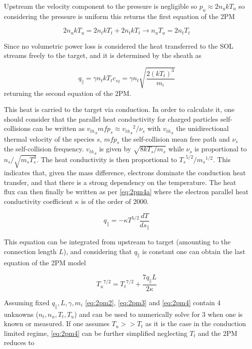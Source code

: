 Upstream the velocity component to the pressure is negligible so $p_u \approx 2 n_u k T_u$ so considering the pressure is uniform this returns the first equation of the 2PM

\begin{equation}
2 n_u k T_u = 2n_{t} k T_{t} + 2n_{t} k T_{t} \rightarrow n_u T_u = 2n_{t}T_{t}
\label{eq:2pm2}
\end{equation}

Since no volumetric power loss is considered the heat transferred to the SOL streams freely to the target, and it is determined by the sheath as

\begin{equation}
q_{\parallel} =  \gamma n_t k T_t {c_s}_t = \gamma n_t \sqrt{\frac{2(kT_t)^3}{m_i}}
\label{eq:2pm3}
\end{equation}
returning the second equation of the 2PM.

This heat is carried to the target via conduction. In order to calculate it, one should consider that the parallel heat conductivity for charged particles self-collisions can be written as ${v_{th}}_s mfp_s \approx {{v_{th}}_s}^2/{\nu_s}$ with ${v_{th}}_s$ the unidirectional thermal velocity of the species $s$, $mfp_s$ the self-collision mean free path and $\nu_s$ the self-collision frequency. ${v_{th}}_s$ is given by $\sqrt{8kT_s/{m_s}}$ while $\nu_s$ is proportional to $n_s/\sqrt{m_s T_s^3}$. The heat conductivity is then proportional to $ {T_s}^{5/2} / {m_s}^{1/2}$. This indicates that, given the mass difference, electrons dominate the conduction heat transfer, and that there is a strong dependency on the temperature. The heat flux can then finally be written as per \autoref{eq:2pm4a} where the electron parallel heat conductivity coefficient $\kappa$ is of the order of 2000.\cite{Stangeby2001}

\begin{equation}
q_{\parallel} = -\kappa T^{5/2} \frac{dT}{ds_{\parallel}}
\label{eq:2pm4a}
\end{equation}

This equation can be integrated from upstream to target (amounting to the connection length $L$), and considering that $q_{\parallel}$ is constant one can obtain the last equation of the 2PM model

\begin{equation}
{T_u}^{7/2} = {T_t}^{7/2} + \frac{7 q_{\parallel} L}{2 \kappa}
\label{eq:2pm4}
\end{equation}

Assuming fixed $q_{\parallel}, L, \gamma, m_i$ \autoref{eq:2pm2}, \ref{eq:2pm3} and \ref{eq:2pm4} contain 4 unknowns ($n_t, n_u, T_t, T_u$) and can be used to numerically solve for 3 when one is known or measured. If one assumes $T_u >> T_t$ as it is the case in the conduction limited regime, \autoref{eq:2pm4} can be further simplified neglecting $T_t$ and the 2PM reduces to

